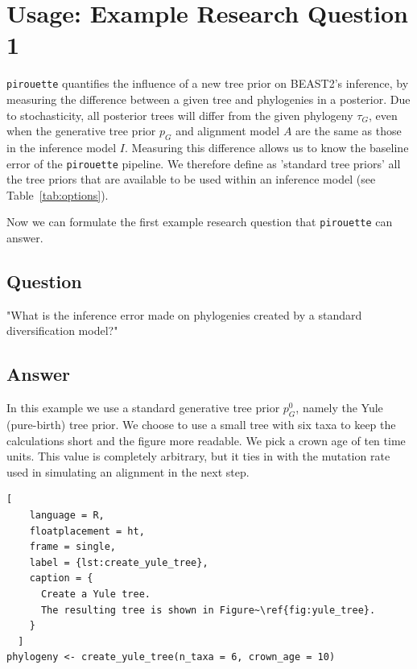 \section{Usage: Example Research Question 1}

\verb;pirouette; quantifies the influence of a new tree prior on BEAST2's 
inference,
by measuring the difference between a given tree and 
phylogenies in a posterior. Due to stochasticity, all posterior trees
will differ from the given phylogeny $\tau_{\mathit{G}}$, 
even when the generative tree prior $\mathit{p_{G}}$ 
and alignment model $\mathit{A}$ are the same as 
those in the inference model $\mathit{I}$.
Measuring this difference allows us to know the baseline error
of the \verb;pirouette; pipeline. We therefore define as 'standard tree priors' 
all the tree priors that are available to be used within an inference model 
(see Table~\ref{tab:options}).

Now we can formulate the first example research question that \verb;pirouette; 
can answer.

\subsection{Question}

"What is the inference error made on phylogenies
created by a standard diversification model?"

\subsection{Answer}

In this example we use a standard generative tree prior $\mathit{p_{G}^0}$, 
namely the Yule (pure-birth) tree prior. 
We choose to use a small tree with six taxa to keep
the calculations short and the figure more readable.
We pick a crown age of ten time units. This value is 
completely arbitrary, but it ties in with the mutation rate 
used in simulating an alignment in the next step.

\begin{lstlisting}[
    language = R,
    floatplacement = ht,
    frame = single, 
    label = {lst:create_yule_tree}, 
    caption = {
      Create a Yule tree. 
      The resulting tree is shown in Figure~\ref{fig:yule_tree}.
    }
  ]
phylogeny <- create_yule_tree(n_taxa = 6, crown_age = 10)
\end{lstlisting}


